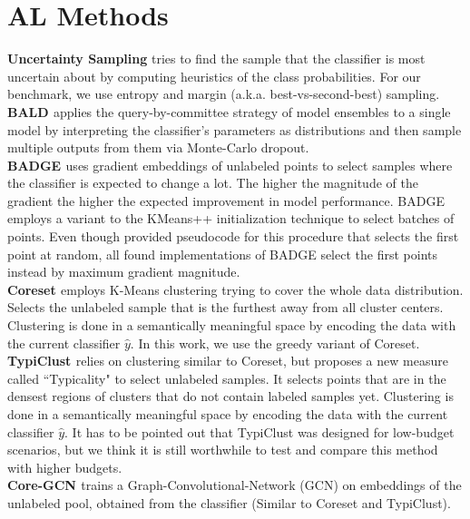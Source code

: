 \documentclass[]{article}
\begin{document}
\section{AL Methods}\label{app:acquisition_functions}
\textbf{Uncertainty Sampling} 
tries to find the sample that the classifier is most uncertain about by computing heuristics of the class probabilities. For our benchmark, we use entropy and margin (a.k.a. best-vs-second-best) sampling.\\
\textbf{BALD \cite{kirsch2019batchbald}}
applies the query-by-committee strategy of model ensembles to a single model by interpreting the classifier's parameters as distributions and then sample multiple outputs from them via Monte-Carlo dropout.\\
\textbf{BADGE \cite{ashdeep}} uses gradient embeddings of unlabeled points to select samples where the classifier is expected to change a lot. The higher the magnitude of the gradient the higher the expected improvement in model performance.
BADGE employs a variant to the KMeans++ initialization technique to select batches of points. Even though \cite{ashdeep} provided pseudocode for this procedure that selects the first point at random, all found implementations of BADGE select the first points instead by maximum gradient magnitude. \\
\textbf{Coreset \cite{sener2017active}}
employs K-Means clustering trying to cover the whole data distribution.
Selects the unlabeled sample that is the furthest away from all cluster centers.
Clustering is done in a semantically meaningful space by encoding the data with the current classifier $\hat y$.
In this work, we use the greedy variant of Coreset.\\
\textbf{TypiClust \cite{hacohen2022active}}
relies on clustering similar to Coreset, but proposes a new measure called ``Typicality" to select unlabeled samples.
It selects points that are in the densest regions of clusters that do not contain labeled samples yet.
Clustering is done in a semantically meaningful space by encoding the data with the current classifier $\hat y$.
It has to be pointed out that TypiClust was designed for low-budget scenarios, but we think it is still worthwhile to test and compare this method with higher budgets. \\
\textbf{Core-GCN \cite{caramalau2021sequential}} trains a Graph-Convolutional-Network (GCN) on embeddings of the unlabeled pool, obtained from the classifier (Similar to Coreset and TypiClust). 
\end{document}
